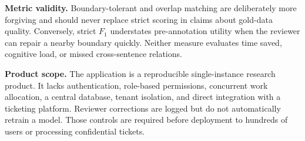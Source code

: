 \textbf{Metric validity.} Boundary-tolerant and overlap matching are deliberately
more forgiving and should never replace strict scoring in claims about gold-data
quality. Conversely, strict $F_1$ understates pre-annotation utility when the
reviewer can repair a nearby boundary quickly. Neither measure evaluates time
saved, cognitive load, or missed cross-sentence relations.

\textbf{Product scope.} The application is a reproducible single-instance
research product. It lacks authentication, role-based permissions, concurrent
work allocation, a central database, tenant isolation, and direct integration
with a ticketing platform. Reviewer corrections are logged but do not
automatically retrain a model. Those controls are required before deployment to
hundreds of users or processing confidential tickets.
